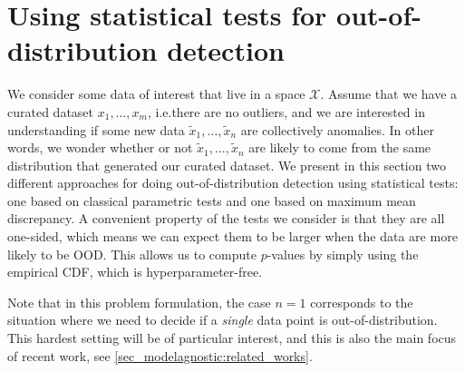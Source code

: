 {\section{Using statistical tests for out-of-distribution detection}

We consider some data of interest that live in a space $\mathcal{X}$. Assume that we have a curated dataset $x_1,\ldots,x_m$, i.e.\@ there are no outliers, and we are interested in understanding if some new data $\tilde{x}_1,\ldots,\tilde{x}_n$ are collectively anomalies. In other words, we wonder whether or not $\tilde{x}_1,\ldots,\tilde{x}_n$ are likely to come from the same distribution that generated our curated dataset. We present in this section two different approaches for doing out-of-distribution detection using statistical tests: one based on classical parametric tests and one based on maximum mean discrepancy. A convenient property of the tests we consider is that they are all one-sided, which means we can expect them to be larger when the data are more likely to be OOD. This allows us to compute $p$-values by simply using the empirical CDF, which is hyperparameter-free.

Note that in this problem formulation, the case $n=1$ corresponds to the situation where we need to decide if a \emph{single} data point is out-of-distribution. This hardest setting will be of particular interest, and this is also the main focus of recent work, see \cref{sec_modelagnostic:related_works}.

}
